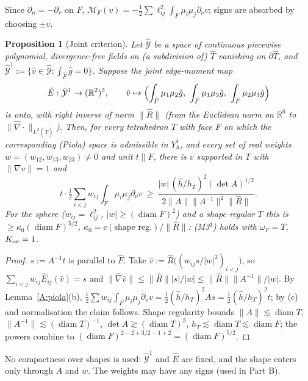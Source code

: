 \documentclass[11pt]{article}
\newtheorem{proposition}[theorem]{Proposition}
\theoremstyle{definition}
\newcommand{\R}{\mathbb R}
\newcommand{\norm}[1]{\lVert #1\rVert}
\newcommand{\M}{\mathcal M}
\DeclareMathOperator{\diam}{diam}
\begin{document}
Since $\partial_n=-\partial_\nu$ on $F$, $\M_F(v)=-\frac12\sum\ell_{ij}^2\int_F\mu_i\mu_j\partial_\nu v$; signs are absorbed by choosing $\pm v$.

\begin{proposition}[Joint criterion]\label{A:joint}
Let $\hat{\mathcal Y}$ be a space of continuous piecewise polynomial, divergence-free fields on (a subdivision of) $\hat T$ vanishing on $\partial\hat T$, and $\hat{\mathcal Y}^1:=\{\hat v\in\hat{\mathcal Y}:\int_{\hat F}\hat g=0\}$. Suppose the joint edge-moment map
\[
\hat E:\hat{\mathcal Y}^1\to(\R^2)^3,\qquad \hat v\mapsto\Bigl(\int_{\hat F}\mu_1\mu_2\hat g,\ \int_{\hat F}\mu_1\mu_3\hat g,\ \int_{\hat F}\mu_2\mu_3\hat g\Bigr)
\]
is onto, with right inverse of norm $\norm{\hat R}$ (from the Euclidean norm on $\R^6$ to $\norm{\hat\nabla\cdot}_{L^2(\hat T)}$). Then, for every tetrahedron $T$ with face $F$ on which the corresponding (Piola) space is admissible in $Y_h^1$, and every set of real weights $w=(w_{12},w_{13},w_{23})\ne0$ and unit $t\parallel F$, there is $v$ supported in $T$ with $\norm{\nabla v}=1$ and
\[
t\cdot\tfrac12\sum_{i<j}w_{ij}\int_F\mu_i\mu_j\partial_\nu v\ \ge\ \frac{|w|\,(\hat h/h_T)^2(\det A)^{1/2}}{2\norm A\norm{A^{-1}}^2\norm{\hat R}} .
\]
For the sphere ($w_{ij}=\ell_{ij}^2$, $|w|\ge(\diam F)^2$) and a shape-regular $T$ this is $\ge\kappa_0(\diam F)^{5/2}$, $\kappa_0=c(\text{shape reg.})/\norm{\hat R}$: (M3$^3$) holds with $\omega_F=T$, $K_{\rm ov}=1$.
\end{proposition}
\begin{proof}
$s:=A^{-1}t$ is parallel to $\hat F$. Take $\hat v:=\hat R\bigl((w_{ij}s/|w|^2)_{i<j}\bigr)$, so $\sum_{i<j}w_{ij}\hat E_{ij}(\hat v)=s$ and $\norm{\hat\nabla\hat v}\le\norm{\hat R}|s|/|w|\le\norm{\hat R}\norm{A^{-1}}/|w|$. By Lemma~\ref{A:piola}(b), $\frac12\sum w_{ij}\int_F\mu_i\mu_j\partial_\nu v=\frac12(\hat h/h_T)^2As=\frac12(\hat h/h_T)^2t$; by (c) and normalisation the claim follows. Shape regularity bounds $\norm A\lesssim\diam T$, $\norm{A^{-1}}\lesssim(\diam T)^{-1}$, $\det A\gtrsim(\diam T)^3$, $h_T\lesssim\diam T\lesssim\diam F$; the powers combine to $(\diam F)^{2-2+3/2-1+2}=(\diam F)^{5/2}$.
\end{proof}
No compactness over shapes is used: $\hat{\mathcal Y}^1$ and $\hat E$ are fixed, and the shape enters only through $A$ and $w$. The weights may have any signs (used in Part B).
\end{document}
